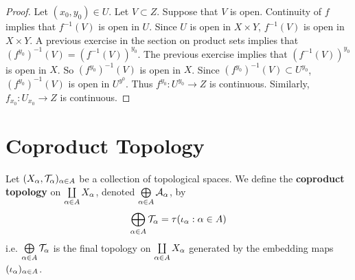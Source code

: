 \documentclass{book}
\begin{document}
	\begin{proof}
		Let $(x_0, y_0) \in U$. Let $V \subset Z$. Suppose that $V$ is open. Continuity of $f$ implies that $f^{-1}(V)$ is open in $U$. Since $U$ is open in $X \times Y$, $f^{-1}(V)$ is open in $X \times Y$. A previous exercise in the section on product sets implies that $(f^{y_0})^{-1}(V) = (f^{-1}(V))^{y_0}$. The previous exercise implies that $(f^{-1}(V))^{y_0}$ is open in $X$. So $(f^{y_0})^{-1}(V)$ is open in $X$. Since $(f^{y_0})^{-1}(V) \subset U^{y_0}$, $(f^{y_0})^{-1}(V)$ is open in $U^{y^0}$. Thus $f^{y_0}: U^{y_0} \rightarrow Z$ is continuous. Similarly, $f_{x_0}: U_{x_0} \rightarrow Z$ is continuous.
	\end{proof}
	
	
	
	
	
	
	
	
	
	
	
	
	
	
	
	
	
	
	
	
	
	
	
	
	
	
	
	
	
	
	
	
	
	
	
	
	
	
	
	
	
	
	
	
	
	
	
	
	
	\newpage
	\section{Coproduct Topology}

	\begin{defn} 
			Let $(X_{\alpha}, \mathcal{T}_{\alpha})_{\alpha \in A}$ be a collection of topological spaces. We define the \textbf{coproduct topology} on $\coprod\limits_{\alpha \in A}X_{\alpha}$, denoted $\bigoplus\limits_{\alpha \in A} \mathcal{A}_{\alpha}$, by 
		$$\bigoplus\limits_{\alpha \in A} \mathcal{T}_{\alpha} = \tau(\iota_{\alpha}: \alpha \in A)$$
		i.e. $\bigoplus\limits_{\alpha \in A} \mathcal{T}_{\alpha}$ is the final topology on $\coprod\limits_{\alpha \in A} X_{\alpha}$ generated by the embedding maps $(\iota_{\alpha})_{\alpha \in A}$.
	\end{defn}
\end{document}
